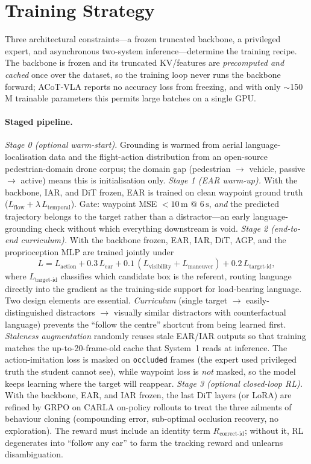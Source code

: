 \documentclass[11pt]{article}
\newcommand{\ear}{EAR}
\newcommand{\iar}{IAR}
\newcommand{\agp}{AGP}
\begin{document}
\section{Training Strategy}
\label{sec:training}

Three architectural constraints---a frozen truncated backbone, a privileged
expert, and asynchronous two-system inference---determine the training
recipe. The backbone is frozen and its truncated KV/features are
\emph{precomputed and cached} once over the dataset, so the training loop
never runs the backbone forward; ACoT-VLA reports no accuracy loss from
freezing, and with only $\sim$150\,M trainable parameters this permits
large batches on a single GPU.

\paragraph{Staged pipeline.}
\emph{Stage 0 (optional warm-start).} Grounding is warmed from aerial
language-localisation data and the flight-action distribution from an
open-source pedestrian-domain drone corpus; the domain gap (pedestrian
$\to$ vehicle, passive $\to$ active) means this is initialisation only.
\emph{Stage 1 (\ear{} warm-up).} With the backbone, \iar{}, and DiT frozen,
\ear{} is trained on clean waypoint ground truth
($L_{\mathrm{flow}} + \lambda\,L_{\mathrm{temporal}}$). Gate: waypoint MSE
$<\!10\,\mathrm{m}$ @ $6\,\mathrm{s}$, \emph{and} the predicted trajectory belongs to
the target rather than a distractor---an early language-grounding check
without which everything downstream is void.
\emph{Stage 2 (end-to-end curriculum).} With the backbone frozen, \ear{},
\iar{}, DiT, \agp{}, and the proprioception MLP are trained jointly under
\[
L = L_{\mathrm{action}} + 0.3\,L_{\mathrm{ear}}
    + 0.1\,(L_{\mathrm{visibility}} + L_{\mathrm{maneuver}})
    + 0.2\,L_{\mathrm{target\text{-}id}},
\]
where $L_{\mathrm{target\text{-}id}}$ classifies which candidate box is the
referent, routing language directly into the gradient as the training-side
support for load-bearing language. Two design elements are essential.
\emph{Curriculum} (single target $\to$ easily-distinguished distractors
$\to$ visually similar distractors with counterfactual language) prevents
the ``follow the centre'' shortcut from being learned first.
\emph{Staleness augmentation} randomly reuses stale \ear{}/\iar{} outputs so
that training matches the up-to-20-frame-old cache that System~1 reads
at inference. The action-imitation loss is masked on \texttt{occluded}
frames (the expert used privileged truth the student cannot see), while
waypoint loss is \emph{not} masked, so the model keeps learning where the
target will reappear.
\emph{Stage 3 (optional closed-loop RL).} With the backbone, \ear{}, and
\iar{} frozen, the last DiT layers (or LoRA) are refined by GRPO on CARLA
on-policy rollouts to treat the three ailments of behaviour cloning
(compounding error, sub-optimal occlusion recovery, no exploration). The
reward must include an identity term $R_{\mathrm{correct\text{-}id}}$;
without it, RL degenerates into ``follow any car'' to farm the tracking
reward and unlearns disambiguation.
\end{document}

